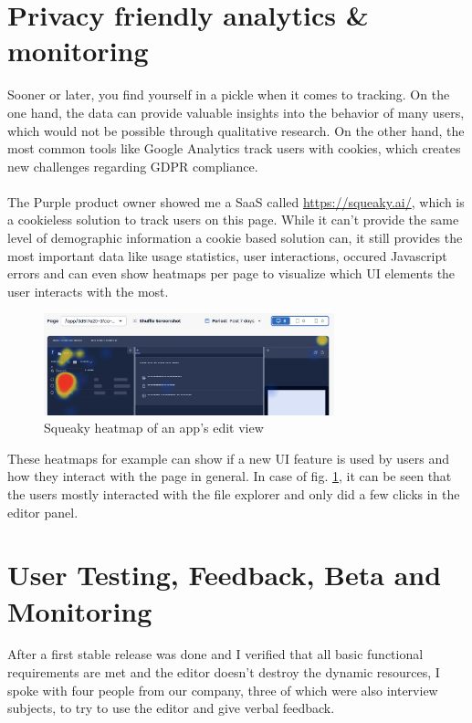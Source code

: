 \section{Privacy friendly analytics \& monitoring}

Sooner or later, you find yourself in a pickle when it comes to tracking.
On the one hand, the data can provide valuable insights into the behavior of many users, which would not be possible through qualitative research.
On the other hand, the most common tools like Google Analytics track users with cookies, which creates new challenges regarding GDPR compliance.
\\\\
The Purple product owner showed me a SaaS called \url{https://squeaky.ai/}, which is a cookieless solution to track users on this page.
While it can't provide the same level of demographic information a cookie based solution can, it still provides the most important data like usage statistics,
user interactions, occured Javascript errors and can even show heatmaps per page to visualize which UI elements the user interacts with the most.

\begin{figure}[h]
  \centering
  \includegraphics[width=0.75\textwidth]{pics/squeaky_heatmap.jpg}
  \caption{Squeaky heatmap of an app's edit view}
  \label{fig:squeaky}
\end{figure}

These heatmaps for example can show if a new UI feature is used by users and how they interact with the page in general.
In case of fig. \ref{fig:squeaky}, it can be seen that the users mostly interacted with the file explorer and only did a few clicks in the editor panel.

\section{User Testing, Feedback, Beta and Monitoring}

After a first stable release was done and I verified that all basic functional requirements are met and the editor doesn't destroy the dynamic resources,
I spoke with four people from our company, three of which were also interview subjects, to try to use the editor and give verbal feedback.


